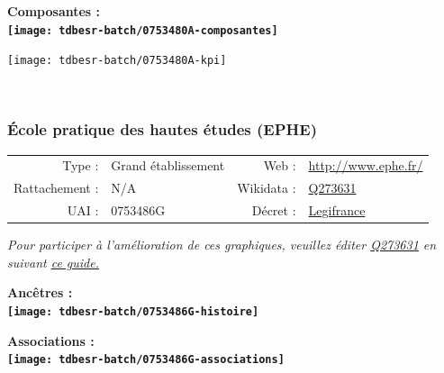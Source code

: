 \documentclass[12pt,french,]{article}
\begin{document}
\hrulefill

\begin{center} \bf Composantes : \\  
\texttt{[image: tdbesr-batch/0753480A-composantes]} \end{center}

\begin{center}\texttt{[image: tdbesr-batch/0753480A-kpi]} \end{center}\checkoddpage

\ifoddpage ~\newpage \fi   

\hypertarget{uxe9cole-pratique-des-hautes-uxe9tudes-ephe}{%
\subsubsection{École pratique des hautes études
(EPHE)}\label{uxe9cole-pratique-des-hautes-uxe9tudes-ephe}}

\begin{tabular*}{\textwidth}{rp{5cm}rl}  
\hline  
Type : & Grand établissement & Web : &\href{http://www.ephe.fr/}{http://www.ephe.fr/} \\  
Rattachement : & N/A & Wikidata : & \href{https://www.wikidata.org/entity/Q273631}{Q273631} \\  
UAI : & 0753486G & Décret : & \href{https://www.legifrance.gouv.fr/affichTexte.do?cidTexte=JORFTEXT000032490129&dateTexte=&categorieLien=id}{Legifrance} \\  
\hline  
\end{tabular*}

\textit{\scriptsize Pour participer à l'amélioration de ces graphiques, veuillez éditer  \href{https://www.wikidata.org/entity/Q273631}{Q273631}  en suivant \href{https://github.com/cpesr/wikidataESR/blob/master/Rmd/wikidataESR.md}{ce guide.}}

\vspace{1cm}  
\begin{minipage}[b]{0.50\textwidth}\begin{center} \bf Ancêtres : \\  
\texttt{[image: tdbesr-batch/0753486G-histoire]} \end{center}\end{minipage}\begin{minipage}[b]{0.50\textwidth}\begin{center} \bf Associations : \\  
\texttt{[image: tdbesr-batch/0753486G-associations]} \end{center}\end{minipage}
\end{document}
